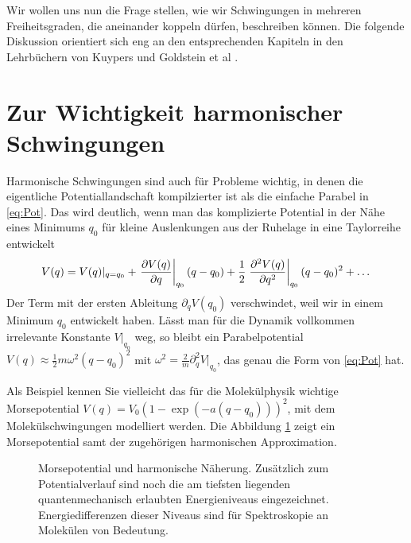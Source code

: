 \documentclass[paper=a4, fontsize=11.0pt, abstractoff, DIV12]{scrartcl}
\begin{document}
Wir wollen uns nun die Frage stellen, wie wir Schwingungen in mehreren
Freiheitsgraden, die aneinander koppeln dürfen, beschreiben können. Die
folgende Diskussion orientiert sich eng an den entsprechenden Kapiteln in den
Lehrbüchern von Kuypers \cite{Kuypers} und Goldstein et al \cite{Goldstein}.

\section{Zur Wichtigkeit harmonischer Schwingungen}

Harmonische Schwingungen sind auch für Probleme wichtig, in denen die
eigentliche Potentiallandschaft kompilzierter ist als die einfache Parabel
in \eqref{eq:Pot}. Das wird deutlich, wenn man das komplizierte Potential in
der Nähe eines Minimums $q_0$ für kleine Auslenkungen aus der Ruhelage in
eine Taylorreihe entwickelt
\begin{equation}
V(q) = V(q)\vert_{q=q_0}+ \left.\frac{\partial V(q)}{\partial q}\right|_{q_0}(q - q_0)  + \frac{1}{2}\left. \frac{\partial^2 V(q)}{\partial {q}^2} \right|_{q_0}(q - q_0)^2 + \dots
\end{equation}
Der Term mit der ersten Ableitung $\partial_q V(q_0)$ verschwindet, weil wir
in einem Minimum $q_0$ entwickelt haben. Lässt man für die Dynamik vollkommen
irrelevante Konstante $V|_{q_0}$ weg, so bleibt ein Parabelpotential
$V(q) \approx \frac{1}{2}m\omega^2 (q-q_0)^2$ mit
$\omega^2 = \frac{2}{m}\partial_q^2 V|_{q_0} $, das genau die Form von
\eqref{eq:Pot} hat.

Als Beispiel kennen Sie vielleicht das für die Molekülphysik wichtige
Morsepotential $V(q) = V_0\left(1-\exp(-a(q-q_0))\right)^2$, mit dem
Molekülschwingungen modelliert werden. Die Abbildung \ref{fig:Morse} zeigt
ein Morsepotential samt der zugehörigen harmonischen Approximation.
\begin{figure}
    \centering
    
    \caption{Morsepotential und harmonische Näherung. Zusätzlich zum
    Potentialverlauf sind noch die am tiefsten liegenden quantenmechanisch
    erlaubten Energieniveaus eingezeichnet. Energiedifferenzen dieser
    Niveaus sind für Spektroskopie an Molekülen von Bedeutung.}
    \label{fig:Morse}
\end{figure}
\end{document}
